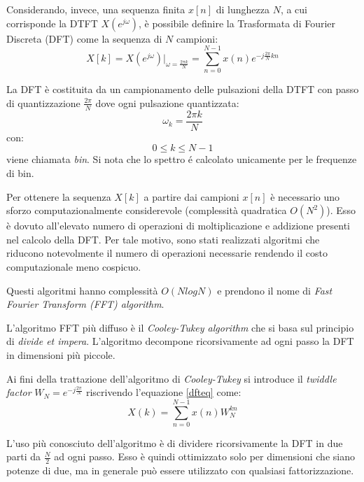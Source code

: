 Considerando, invece, una sequenza finita $x[n]$ di lunghezza $N$, a cui corrisponde la DTFT $X(e^{j\omega})$, è possibile definire la Trasformata di Fourier Discreta (DFT) come la sequenza di $N$ campioni:
\begin{equation}
	X[k]=X(e^{j\omega}) |_{\omega = \frac{2 \pi k}{N}} = \sum_{n=0}^{N-1} x(n)e^{-j \frac{2 \pi}{N} k n}
	\label{dfteq}
\end{equation}

La DFT è costituita da un campionamento delle pulsazioni della DTFT con passo di quantizzazione $\frac{2 \pi}{N}$ dove ogni pulsazione quantizzata:
\begin{equation}
	\omega _k = \frac{2 \pi k}{N} 
\end{equation}
con:
$$0 \leq k \leq N-1$$
viene chiamata \textit{bin}. Si nota che lo spettro \'e calcolato unicamente per le frequenze di bin.

Per ottenere la sequenza $X[k]$ a partire dai campioni $x[n]$ è necessario uno sforzo computazionalmente considerevole (complessità quadratica $O(N^2)$). Esso è dovuto all'elevato numero di operazioni di moltiplicazione e addizione presenti nel calcolo della DFT. Per tale motivo, sono stati realizzati algoritmi che riducono notevolmente il numero di operazioni necessarie rendendo il costo computazionale meno cospicuo.

Questi algoritmi hanno complessità $O(NlogN)$ e prendono il nome di 
\textit{Fast Fourier Transform (FFT) algorithm}.

L'algoritmo FFT più diffuso è il \textit{Cooley-Tukey algorithm} che si basa sul principio di \textit{divide et impera}. L'algoritmo decompone ricorsivamente ad ogni passo la DFT in dimensioni più piccole.

Ai fini della trattazione dell'algoritmo di \textit{Cooley-Tukey} si introduce il \textit{twiddle factor} $W_N = e^{-j \frac{2 \pi}{N}}$ riscrivendo l'equazione \ref{dfteq} come:
\begin{equation}
	X(k)=\sum_{n=0}^{N-1} x(n)W_N^{kn} 
	\label{dfteq2}
\end{equation}

L'uso più conosciuto dell'algoritmo è di dividere ricorsivamente la DFT in due parti da $\frac{N}{2}$ ad ogni passo. Esso è quindi ottimizzato solo per dimensioni che siano potenze di due, ma in generale può essere utilizzato con qualsiasi fattorizzazione.

